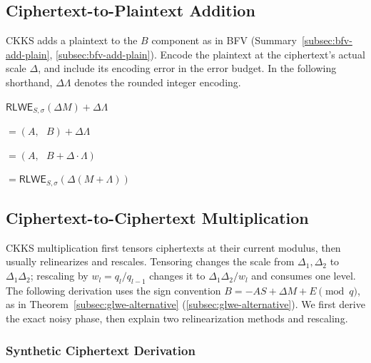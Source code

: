 \subsection{Ciphertext-to-Plaintext Addition}
\label{subsec:ckks-add-plain}

CKKS adds a plaintext to the $B$ component as in BFV (Summary~\ref*{subsec:bfv-add-plain}, \autoref{subsec:bfv-add-plain}). Encode the plaintext at the ciphertext's actual scale $\Delta$, and include its encoding error in the error budget. In the following shorthand, $\Delta\Lambda$ denotes the rounded integer encoding.



\begin{tcolorbox}[title={\textbf{\tboxlabel{\ref*{subsec:ckks-add-plain}} CKKS Ciphertext-to-Plaintext Addition}}]
$\textsf{RLWE}_{S, \sigma}(\Delta M) + \Delta\Lambda $

$=  (A, \text{ } B) + \Delta\Lambda$

$=  (A, \text{ } B + \Delta\cdot\Lambda)$

$= \textsf{RLWE}_{S, \sigma}(\Delta (M + \Lambda) )$
\end{tcolorbox}




\subsection{Ciphertext-to-Ciphertext Multiplication}
\label{subsec:ckks-mult-cipher}

CKKS multiplication first tensors ciphertexts at their current modulus, then usually relinearizes and rescales. Tensoring changes the scale from $\Delta_1,\Delta_2$ to $\Delta_1\Delta_2$; rescaling by $w_l=q_l/q_{l-1}$ changes it to $\Delta_1\Delta_2/w_l$ and consumes one level. The following derivation uses the sign convention $B=-AS+\Delta M+E\pmod q$, as in Theorem~\ref*{subsec:glwe-alternative} (\autoref{subsec:glwe-alternative}). We first derive the exact noisy phase, then explain two relinearization methods and rescaling.


\subsubsection{Synthetic Ciphertext Derivation}
\label{subsubsec:ckks-mult-cipher-relation}

